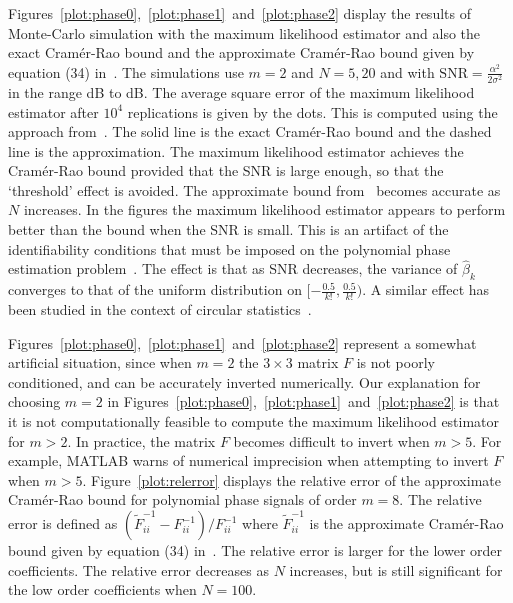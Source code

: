 \documentclass[review]{elsarticle}
\begin{document}
Figures~\ref{plot:phase0},~\ref{plot:phase1}~and~\ref{plot:phase2} display the results of Monte-Carlo simulation with the maximum likelihood estimator and also the exact Cram\'{e}r-Rao bound and the approximate Cram\'{e}r-Rao bound given by equation (34) in~\cite{Peleg1991_CRB_PPS_1991}.  The simulations use $m=2$ and $N=5,20$ and with $\text{SNR} = \tfrac{\alpha^2}{2\sigma^2}$ in the range \unit[-5]{dB} to \unit[25]{dB}.   The average square error of the maximum likelihood estimator after $10^4$ replications is given by the dots.  This is computed using the approach from~\cite[Sec.~10.1]{McKilliam2010thesis}.  The solid line is the exact Cram\'{e}r-Rao bound and the dashed line is the approximation.  The maximum likelihood estimator achieves the Cram\'{e}r-Rao bound provided that the SNR is large enough, so that the `threshold' effect is avoided.  The approximate bound from~\cite{Peleg1991_CRB_PPS_1991} becomes accurate as $N$ increases.  In the figures the maximum likelihood estimator appears to perform better than the bound when the SNR is small.  This is an artifact of the identifiability conditions that must be imposed on the polynomial phase estimation problem~\cite[Ch.~7]{McKilliam2010thesis}\cite{McKilliam2009IndentifiabliltyAliasingPolyphase}.  The effect is that as SNR decreases, the variance of $\hat{\beta}_k$ converges to that of the uniform distribution on $[-\tfrac{0.5}{k!},\tfrac{0.5}{k!})$.  A similar effect has been studied in the context of circular statistics~\cite{6365847}.

Figures~\ref{plot:phase0},~\ref{plot:phase1}~and~\ref{plot:phase2} represent a somewhat artificial situation, since when $m=2$ the $3 \times 3$ matrix $F$ is not poorly conditioned, and can be accurately inverted numerically.  Our explanation for choosing $m=2$ in Figures~\ref{plot:phase0},~\ref{plot:phase1}~and~\ref{plot:phase2} is that it is not computationally feasible to compute the maximum likelihood estimator for $m>2$.  In practice, the matrix $F$ becomes difficult to invert when $m>5$.  For example, MATLAB warns of numerical imprecision when attempting to invert $F$ when $m>5$.  Figure~\ref{plot:relerror} displays the relative error of the approximate Cram\'{e}r-Rao bound for polynomial phase signals of order $m=8$.  The relative error is defined as $(\tilde{F}_{ii}^{-1} - F_{ii}^{-1})/F_{ii}^{-1}$ where $\tilde{F}_{ii}^{-1}$ is the approximate Cram\'{e}r-Rao bound given by equation (34) in~\cite{Peleg1991_CRB_PPS_1991}.  The relative error is larger for the lower order coefficients.  The relative error decreases as $N$ increases, but is still significant for the low order coefficients when $N=100$.
\end{document}

